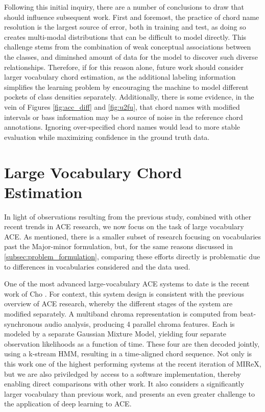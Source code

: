Following this initial inquiry, there are a number of conclusions to draw that should influence subsequent work.
First and foremost, the practice of chord name resolution is the largest source of error, both in training and test, as doing so creates multi-modal distributions that can be difficult to model directly.
This challenge stems from the combination of weak conceptual associations between the classes, and diminshed amount of data for the model to discover such diverse relationships.
Therefore, if for this reason alone, future work should consider larger vocabulary chord estimation, as the additional labeling information simplifies the learning problem by encouraging the machine to model different pockets of class densities separately.
Additionally, there is some evidence, in the vein of Figures \ref{fig:acc_diff} and \ref{fig:u2fu}, that chord names with modified intervals or bass information may be a source of noise in the reference chord annotations.
Ignoring over-specified chord names would lead to more stable evaluation while maximizing confidence in the ground truth data.



\section{Large Vocabulary Chord Estimation}
\label{subsec:large_vocabulary_ace}

In light of observations resulting from the previous study, combined with other recent trends in ACE research, we now focus on the task of large vocabulary ACE.
As mentioned, there is a smaller subset of research focusing on vocabularies past the Major-minor formulation, but, for the same reasons discussed in \ref{subsec:problem_formulation}, comparing these efforts directly is problematic due to differences in vocabularies considered and the data used.

One of the most advanced large-vocabulary ACE systems to date is the recent work of Cho \cite{Cho2014}.
For context, this system design is consistent with the previous overview of ACE research, whereby the different stages of the system are modified separately.
A multiband chroma representation is computed from beat-synchronous audio analysis, producing 4 parallel chroma features.
Each is modeled by a separate Gaussian Mixture Model, yielding four separate observation likelihoods as a function of time.
These four are then decoded jointly, using a k-stream HMM, resulting in a time-aligned chord sequence.
Not only is this work one of the highest performing systems at the recent iteration of MIReX, but we are also priviledged by access to a software implementation, thereby enabling direct comparisons with other work.
It also considers a significantly larger vocabulary than previous work, and presents an even greater challenge to the application of deep learning to ACE.


